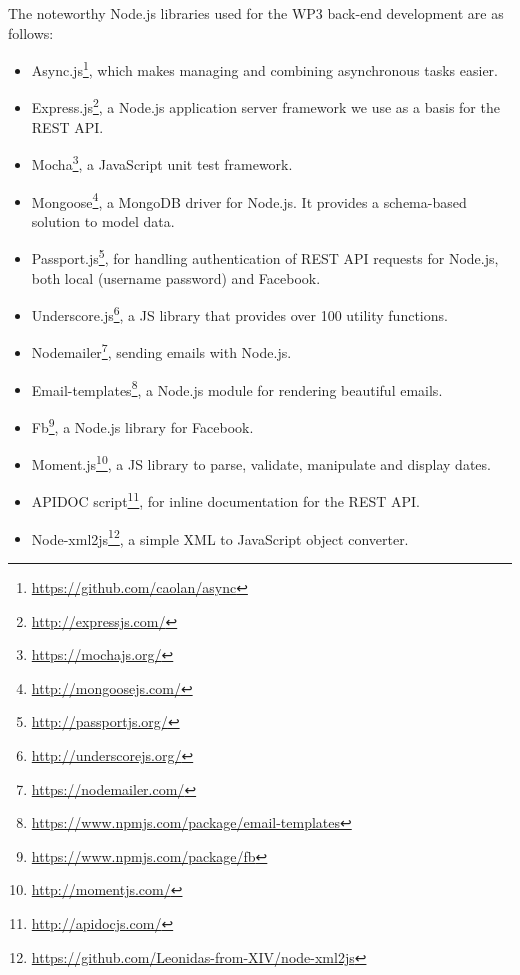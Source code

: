 The noteworthy Node.js libraries used for the WP3 back-end development are as follows:

\begin{itemize}

\item Async.js\footnote{\url{https://github.com/caolan/async}}, which makes managing and combining asynchronous tasks easier. 

\item Express.js\footnote{\url{http://expressjs.com/}}, a Node.js application server framework we use as a basis for the REST API. 

\item Mocha\footnote{\url{https://mochajs.org/}}, a JavaScript unit test framework. 

\item Mongoose\footnote{\url{http://mongoosejs.com/}}, a MongoDB driver for Node.js. It provides a schema-based solution to model data. 

\item Passport.js\footnote{\url{http://passportjs.org/}}, for handling authentication of REST API requests for Node.js, both local (username password) and Facebook. 

\item Underscore.js\footnote{\url{http://underscorejs.org/}}, a JS library that provides over 100 utility functions. 

\item Nodemailer\footnote{\url{https://nodemailer.com/}}, sending emails with Node.js.

\item Email-templates\footnote{\url{https://www.npmjs.com/package/email-templates}}, a Node.js module for rendering beautiful emails.

\item Fb\footnote{\url{https://www.npmjs.com/package/fb}}, a Node.js library for Facebook.

\item Moment.js\footnote{\url{http://momentjs.com/}}, a JS library to parse, validate, manipulate and display dates. 

\item APIDOC script\footnote{\url{http://apidocjs.com/}}, for inline documentation for the REST API. 

\item Node-xml2js\footnote{\url{https://github.com/Leonidas-from-XIV/node-xml2js}}, a simple XML to JavaScript object converter. 


\end{itemize}
